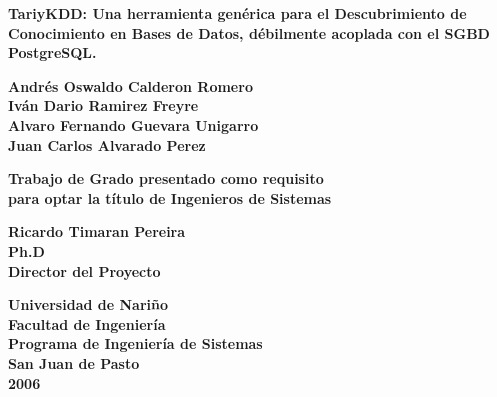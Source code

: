 \pagestyle{empty}
\begin{center}
\textbf{TariyKDD: Una herramienta gen\'erica para el Descubrimiento de Conocimiento en Bases de Datos, d\'ebilmente acoplada con el SGBD PostgreSQL.}\end{center}
\vspace*{3cm}

\begin{center}
\textbf{Andr\'es Oswaldo Calderon Romero \\
Iv\'an Dario Ramirez Freyre \\
Alvaro Fernando Guevara Unigarro \\
Juan Carlos Alvarado Perez}\end{center}
\vspace*{2cm}

\begin{center}
\textbf{Trabajo de Grado presentado como requisito\\
para optar la t\'itulo de Ingenieros de Sistemas}
\end{center}
\vspace*{2cm}

\begin{center}
\textbf{Ricardo Timaran Pereira\\
Ph.D\\
Director del Proyecto}
\end{center}
\vspace*{2cm}

\begin{center}
\textbf{Universidad de Nari\~no \\ 
Facultad de Ingenier\'ia\\
Programa de Ingenier\'ia de Sistemas\\
San Juan de Pasto\\
2006}\end{center}
